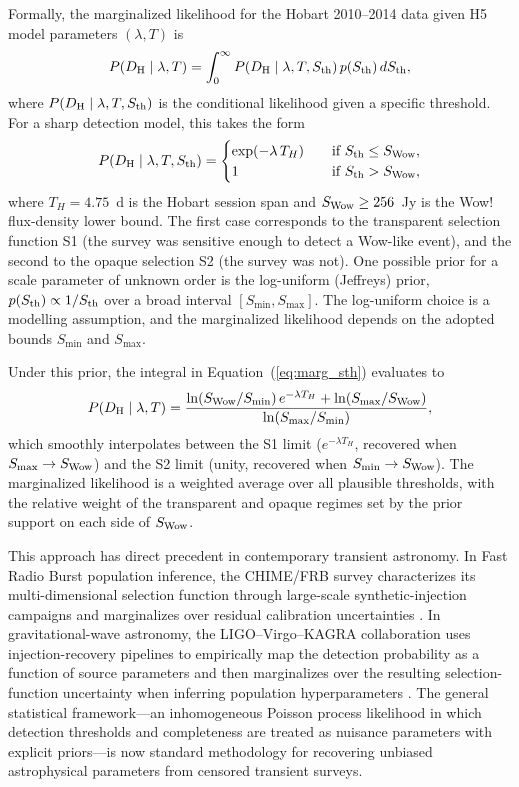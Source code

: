 \documentclass[twocolumn]{aastex701}
\begin{document}
Formally, the marginalized likelihood for the Hobart 2010--2014 data given H5 model parameters $(\lambda,T)$ is
\begin{equation}
P(D_{\rm H}\mid\lambda,T)
=
\int_0^\infty
P(D_{\rm H}\mid\lambda,T,S_{\rm th})\,
p(S_{\rm th})\,
dS_{\rm th},
\label{eq:marg_sth}
\end{equation}
where $P(D_{\rm H}\mid\lambda,T,S_{\rm th})$ is the conditional likelihood given a specific threshold. For a sharp detection model, this takes the form
\begin{equation}
P(D_{\rm H}\mid\lambda,T,S_{\rm th})
=
\begin{cases}
\exp(-\lambda\,T_H) \quad & \text{if } S_{\rm th}\leq S_{\rm Wow},\\
1 \quad & \text{if } S_{\rm th}>S_{\rm Wow},
\end{cases}
\label{eq:cond_sth}
\end{equation}
where $T_H=4.75$~d is the Hobart session span and $S_{\rm Wow}\geq256$~Jy is the Wow! flux-density lower bound. The first case corresponds to the transparent selection function S1 (the survey was sensitive enough to detect a Wow-like event), and the second to the opaque selection S2 (the survey was not). One possible prior for a scale parameter of unknown order is the log-uniform (Jeffreys) prior, $p(S_{\rm th})\propto1/S_{\rm th}$ over a broad interval $[S_{\min},S_{\max}]$. The log-uniform choice is a modelling assumption, and the marginalized likelihood depends on the adopted bounds $S_{\min}$ and $S_{\max}$.

Under this prior, the integral in Equation~(\ref{eq:marg_sth}) evaluates to
\begin{equation}
P(D_{\rm H}\mid\lambda,T)
=
\frac{
\ln(S_{\rm Wow}/S_{\min})\,e^{-\lambda T_H}
+\ln(S_{\max}/S_{\rm Wow})
}
{\ln(S_{\max}/S_{\min})},
\label{eq:marg_result}
\end{equation}
which smoothly interpolates between the S1 limit ($e^{-\lambda T_H}$, recovered when $S_{\max}\rightarrow S_{\rm Wow}$) and the S2 limit (unity, recovered when $S_{\min}\rightarrow S_{\rm Wow}$). The marginalized likelihood is a weighted average over all plausible thresholds, with the relative weight of the transparent and opaque regimes set by the prior support on each side of $S_{\rm Wow}$.

This approach has direct precedent in contemporary transient astronomy. In Fast Radio Burst population inference, the CHIME/FRB survey characterizes its multi-dimensional selection function through large-scale synthetic-injection campaigns and marginalizes over residual calibration uncertainties \citep{amiri2021}. In gravitational-wave astronomy, the LIGO--Virgo--KAGRA collaboration uses injection-recovery pipelines to empirically map the detection probability as a function of source parameters and then marginalizes over the resulting selection-function uncertainty when inferring population hyperparameters \citep{mandel2019,abbott2023_pop}. The general statistical framework---an inhomogeneous Poisson process likelihood in which detection thresholds and completeness are treated as nuisance parameters with explicit priors---is now standard methodology for recovering unbiased astrophysical parameters from censored transient surveys.
\end{document}
